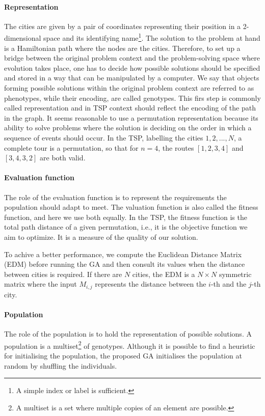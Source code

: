 \documentclass[10pt,a4paper]{article}
\begin{document}
\paragraph*{Representation}
The cities are given by a pair of coordinates representing their position in a 2-dimensional space and its identifying name\footnote{A simple index or label is sufficient.}. The solution to the problem at hand is a Hamiltonian path where the nodes are the cities. Therefore, to set up a bridge between the original problem context and the problem-solving space where evolution takes place, one has to decide how possible solutions should be specified and stored in a way that can be manipulated by a computer. We say that objects forming possible solutions within the original problem context are referred to as phenotypes, while their encoding, are called genotypes. This firs step is commonly called representation and in TSP context should reflect the encoding of the path in the graph. It seems reasonable to use a permutation representation because its ability to solve problems where the solution is deciding on the order in which a sequence of events should occur. In the TSP, labelling the cities $1, 2, ..., N$, a complete tour is a permutation, so that for $n=4$, the routes $\left[1, 2, 3, 4 \right]$ and $\left[3, 4, 3, 2 \right]$ are both valid.

\paragraph*{Evaluation function} 
The role of the evaluation function is to represent the requirements the population should adapt to meet. The valuation function is also called the fitness function, and here we use both equally. In the TSP, the fitness function is the total path distance of a given permutation, i.e., it is the objective function we aim to optimize. It is a measure of the quality of our solution.

To achive a better performance, we compute the Euclidean Distance Matrix (EDM) before running the GA and then consult its values when the distance between cities is required. If there are $N$ cities, the EDM is a $N \times N$ symmetric matrix where the input $M_{i,j}$ represents the distance between the $i$-th and the $j$-th city.

\paragraph*{Population}
The role of the population is to hold the representation of possible solutions. A population is a multiset\footnote{A multiset is a set where multiple copies of an element are possible.} of genotypes. Although it is possible to find a heuristic for initialising the population, the proposed GA initialises the population at random by shuffling the individuals.
\end{document}
